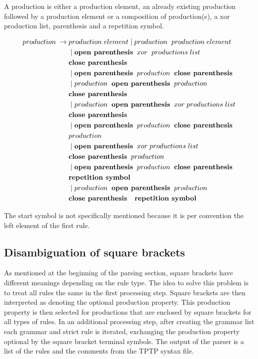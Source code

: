 A production is either a production element, an already existing production followed by a production element or a composition of production(s), a xor production list, parenthesis and a repetition symbol. 

\begin{align*}
	production\; \rightarrow\; &production\; element
                \mid production\;\; production\; element \\
               &\mid \textbf{open parenthesis}\;\; xor\; \;productions\; list\;\; \\
               &\textbf{close parenthesis} \\
               &\mid \textbf{open parenthesis}\;\; production\;\; \textbf{close parenthesis} \\
               &\mid production \;\;\textbf{open parenthesis}\;\; production \\
               &\textbf{close parenthesis} \\
               &\mid production\;\; \textbf{open parenthesis} \;\;xor \;productions\; list\\
               &\textbf{close parenthesis} \\
               &\mid \textbf{open parenthesis} \;\;production \;\;\textbf{close parenthesis} \\
               &production \\
               &\mid \textbf{open parenthesis}\;\; xor\; productions\; list\\ 
               &\textbf{close parenthesis}\;\; production \\
               &\mid \textbf{open parenthesis}\;\; production\;\; \textbf{close parenthesis} \\
               &\textbf{repetition symbol}\\
               &\mid production\;\; \textbf{open parenthesis} \;\;production \\
               &\textbf{close parenthesis \; repetition symbol}
\end{align*}


The start symbol is not specifically mentioned because it is per convention the left element of the first rule.


\subsection{Disambiguation of  square brackets}\label{sec:ConceptDisambiguation}
As mentioned at the beginning of the parsing section, square brackets have different meanings depending on the rule type.
The idea to solve this problem is to treat all rules the same in the first processing step.
Square brackets are then interpreted as denoting the optional production property.
This production property is then selected for productions that are enclosed by square brackets for all types of rules.
In an additional processing step, after creating the grammar list each grammar and strict rule is iterated, exchanging the production property optional by the square bracket terminal symbols.
The output of the parser is a list of the rules and the comments from the \ac{TPTP} syntax file.

